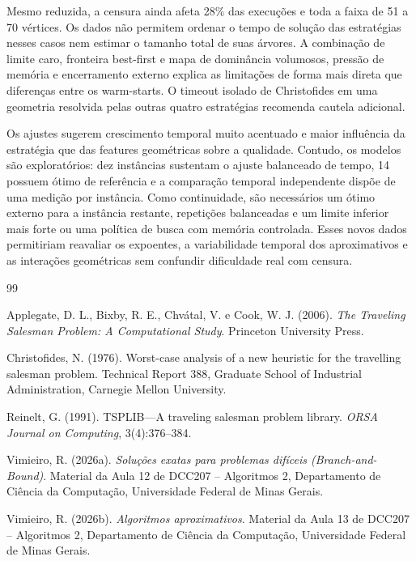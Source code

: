 \documentclass[12pt]{article}
\begin{document}
Mesmo reduzida, a censura ainda afeta 28\% das execuções e toda a faixa de 51 a
70 vértices. Os dados não permitem ordenar o tempo de solução das estratégias
nesses casos nem estimar o tamanho total de suas árvores. A combinação de limite
caro, fronteira best-first e mapa de dominância volumosos, pressão de memória e
encerramento externo explica as limitações de forma mais direta que diferenças
entre os warm-starts. O timeout isolado de Christofides em uma geometria
resolvida pelas outras quatro estratégias recomenda cautela adicional.

Os ajustes sugerem crescimento temporal muito acentuado e maior influência da
estratégia que das features geométricas sobre a qualidade. Contudo, os modelos
são exploratórios: dez instâncias sustentam o ajuste balanceado de tempo,
14 possuem ótimo de referência e a comparação temporal independente dispõe de
uma medição por instância. Como continuidade, são necessários um ótimo externo
para a instância restante, repetições balanceadas e um limite inferior mais
forte ou uma política de busca com memória controlada. Esses novos dados
permitiriam reavaliar os expoentes, a variabilidade temporal dos aproximativos e
as interações geométricas sem confundir dificuldade real com censura.

\begin{thebibliography}{99}

Applegate, D. L., Bixby, R. E., Chvátal, V. e Cook, W. J. (2006).
\newblock \emph{The Traveling Salesman Problem: A Computational Study}.
\newblock Princeton University Press.

Christofides, N. (1976).
\newblock Worst-case analysis of a new heuristic for the travelling salesman
problem.
\newblock Technical Report 388, Graduate School of Industrial Administration,
Carnegie Mellon University.

Reinelt, G. (1991).
\newblock TSPLIB---A traveling salesman problem library.
\newblock \emph{ORSA Journal on Computing}, 3(4):376--384.

Vimieiro, R. (2026a).
\newblock \emph{Soluções exatas para problemas difíceis (Branch-and-Bound)}.
\newblock Material da Aula 12 de DCC207 -- Algoritmos 2, Departamento de
Ciência da Computação, Universidade Federal de Minas Gerais.

Vimieiro, R. (2026b).
\newblock \emph{Algoritmos aproximativos}.
\newblock Material da Aula 13 de DCC207 -- Algoritmos 2, Departamento de
Ciência da Computação, Universidade Federal de Minas Gerais.

\end{thebibliography}
\end{document}
